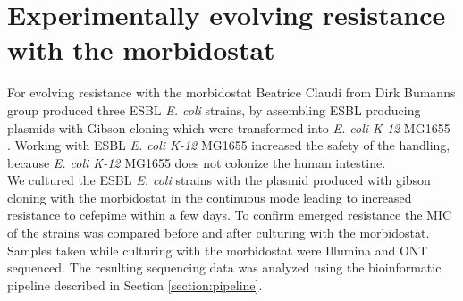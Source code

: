 \section{Experimentally evolving resistance with the morbidostat}
For evolving resistance with the morbidostat Beatrice Claudi from Dirk Bumanns group  produced three ESBL \textit{E. coli} strains, by assembling ESBL producing plasmids with Gibson cloning which were transformed into \textit{E. coli K-12} MG1655 \cite{bioz.com_bioz_nodate}. Working with ESBL \textit{E. coli K-12} MG1655 increased the safety of the handling, because \textit{E. coli K-12} MG1655 does not colonize the human intestine.\\
We cultured the ESBL \textit{E. coli} strains with the plasmid produced with gibson cloning with the morbidostat in the continuous mode leading to increased resistance to cefepime within a few days. To confirm emerged resistance the MIC of the strains was compared before and after culturing with the morbidostat. Samples taken while culturing with the morbidostat were Illumina and ONT sequenced. The resulting sequencing data was analyzed using the bioinformatic pipeline described in Section \ref{section:pipeline}.

